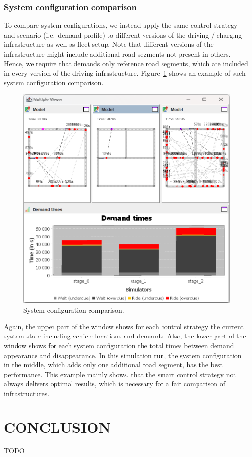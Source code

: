 \documentclass[a4paper,twoside]{article}
\begin{document}
	\subsubsection{System configuration comparison}
	\label{sec:infrastructure-comparison}
	
	To compare system configurations, we instead apply the same control strategy and scenario (i.e.\ demand profile) to different versions of the driving / charging infrastructure as well as fleet setup.
	Note that different versions of the infrastructure might include additional road segments not present in others.
	Hence, we require that demands only reference road segments, which are included in every version of the driving infrastructure.
	Figure~\ref{fig:infratructure-comparison} shows an example of such system configuration comparison.
	
	\begin{figure}[!ht]
		\includegraphics[width=\columnwidth]{infrastructure_comparison.png}
		\caption{System configuration comparison.}
		\label{fig:infratructure-comparison}
	\end{figure}
	
	Again, the upper part of the window shows for each control strategy the current system state including vehicle locations and demands.
	Also, the lower part of the window shows for each system configuration the total times between demand appearance and disappearance.
	In this simulation run, the system configuration in the middle, which adds only one additional road segment, has the best performance.
	This example mainly shows, that the smart control strategy not always delivers optimal results, which is necessary for a fair comparison of infrastructures.
	
	\section{\uppercase{Conclusion}}
	\label{sec:conclusion}
	
	TODO
	
	
	
	{\small
		}
	
	
\end{document}
